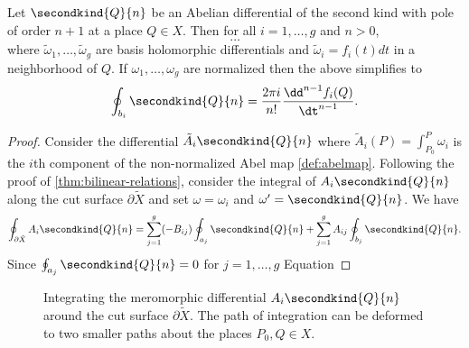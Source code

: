 \begin{lemma} \label{lem:second-kind-b-periods}
  Let $\secondkind{Q}{n}$ be an Abelian differential of the second kind with
  pole of order $n+1$ at a place $Q \in X$. Then for all $i=1,\ldots, g$ and $n
  > 0$,
  \begin{equation}
  \ldots
  \end{equation}
  where $\tilde{\omega}_1, \ldots, \tilde{\omega}_g$ are basis holomorphic
  differentials and $\tilde{\omega}_i = f_i(t)dt$ in a neighborhood of $Q$. If
  $\omega_1, \ldots, \omega_g$ are normalized then the above simplifies to
  \begin{equation}
  \oint_{b_i} \secondkind{Q}{n} = \frac{2 \pi i}{n!} \frac{\dd^{n-1} f_i
    (Q)}{\dt^{n-1}}.
  \end{equation}
\end{lemma}
\begin{proof}
  Consider the differential $\tilde{A}_i \secondkind{Q}{n}$ where
  $\tilde{A}_i(P) = \int_{P_0}^P \omega_i$ is the $i$th component of the
  non-normalized Abel map \ref{def:abelmap}. Following the proof of
  \ref{thm:bilinear-relations}, consider the integral of $A_i
  \secondkind{Q}{n}$ along the cut surface $\partial \tilde{X}$ and set $\omega
  = \omega_i$ and $\omega' = \secondkind{Q}{n}$. We have
  \begin{equation}
    \oint_{\partial \tilde{X}} A_i \secondkind{Q}{n}
    =
    \sum_{j=1}^g (-B_{ij}) \oint_{a_j} \secondkind{Q}{n}
    +
    \sum_{j=1}^g A_{ij} \oint_{b_j} \secondkind{Q}{n}.
  \end{equation}
  Since $\oint_{a_j} \secondkind{Q}{n} = 0$ for $j=1,\ldots,g$ Equation
\end{proof}


\begin{figure}
  \centering
  \caption{Integrating the meromorphic differential $A_i \secondkind{Q}{n}$
    around the cut surface $\partial \tilde{X}$. The path of integration can be
    deformed to two smaller paths about the places $P_0,Q \in X$.}
\end{figure}


